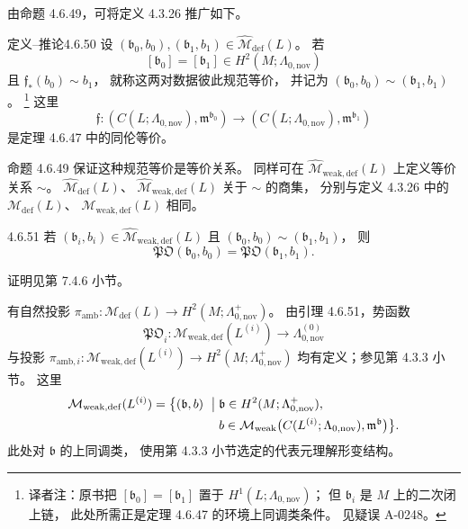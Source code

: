 由命题 4.6.49，可将定义 4.3.26 推广如下。
\begin{statement}{定义--推论}{4.6.50}\label{defcor:4-6-50}
设 $(\mathfrak b_0,b_0),(\mathfrak b_1,b_1)
\in\widehat{\mathcal M}_{\mathrm{def}}(L)$。
若
\[
[\mathfrak b_0]=[\mathfrak b_1]
\in H^2(M;\Lambda_{0,\mathrm{nov}})
\]
且 $\mathfrak f_*(b_0)\sim b_1$，
就称这两对数据彼此规范等价，
并记为
$(\mathfrak b_0,b_0)\sim(\mathfrak b_1,b_1)$
。
\footnote{译者注：原书把
$[\mathfrak b_0]=[\mathfrak b_1]$
置于 $H^1(L;\Lambda_{0,\mathrm{nov}})$；
但 $\mathfrak b_i$ 是 $M$ 上的二次闭上链，
此处所需正是定理 4.6.47 的环境上同调类条件。
见疑误 A-0248。}
这里
\[
\mathfrak f\colon
(C(L;\Lambda_{0,\mathrm{nov}}),
 \mathfrak m^{\mathfrak b_0})
\longrightarrow
(C(L;\Lambda_{0,\mathrm{nov}}),
 \mathfrak m^{\mathfrak b_1})
\]
是定理 4.6.47 中的同伦等价。

命题 4.6.49 保证这种规范等价是等价关系。
同样可在
$\widehat{\mathcal M}_{\mathrm{weak,def}}(L)$
上定义等价关系 $\sim$。
$\widehat{\mathcal M}_{\mathrm{def}}(L)$、
$\widehat{\mathcal M}_{\mathrm{weak,def}}(L)$
关于 $\sim$ 的商集，
分别与定义 4.3.26 中的
$\mathcal M_{\mathrm{def}}(L)$、
$\mathcal M_{\mathrm{weak,def}}(L)$ 相同。
\end{statement}

\begin{lemma}{4.6.51}\label{lem:4-6-51}
若 $(\mathfrak b_i,b_i)
\in\widehat{\mathcal M}_{\mathrm{weak,def}}(L)$
且 $(\mathfrak b_0,b_0)\sim(\mathfrak b_1,b_1)$，
则
\[
\mathfrak{PO}(\mathfrak b_0,b_0)
=\mathfrak{PO}(\mathfrak b_1,b_1).
\]
\end{lemma}
证明见第 7.4.6 小节。

有自然投影
$\pi_{\mathrm{amb}}\colon
\mathcal M_{\mathrm{def}}(L)
\to H^2(M;\Lambda^+_{0,\mathrm{nov}})$。
由引理 4.6.51，势函数
\[
\mathfrak{PO}_i\colon
\mathcal M_{\mathrm{weak,def}}(L^{(i)})
\longrightarrow\Lambda_{0,\mathrm{nov}}^{(0)}
\]
与投影
$\pi_{\mathrm{amb},i}\colon
\mathcal M_{\mathrm{weak,def}}(L^{(i)})
\to H^2(M;\Lambda^+_{0,\mathrm{nov}})$
均有定义；参见第 4.3.3 小节。
这里
\[
\begin{aligned}
\mathcal M_{\mathrm{weak,def}}(L^{(i)})
=\bigl\{(\mathfrak b,b)\ \bigm|\;&
\mathfrak b\in H^2(M;\Lambda^+_{0,\mathrm{nov}}),\\
&b\in\mathcal M_{\mathrm{weak}}
\bigl(C(L^{(i)};\Lambda_{0,\mathrm{nov}}),
      \mathfrak m^{\mathfrak b}\bigr)\bigr\}.
\end{aligned}
\]
此处对 $\mathfrak b$ 的上同调类，
使用第 4.3.3 小节选定的代表元理解形变结构。

